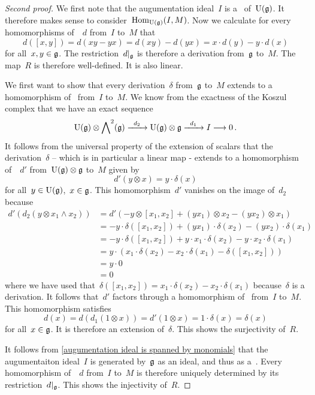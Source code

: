 \begin{proof}[Second proof]
  We first note that the augumentation ideal~$I$ is a~\submodule{$\Univ(\glie)$} of~$\Univ(\glie)$.
  It therefore makes sense to consider~$\operatorname{Hom}_{\operatorname{U}(\mathfrak{g})}(I, M)$.
  Now we calculate for every homomorphisms of~\modules{$\Univ(\glie)$}~$d$ from~$I$ to~$M$ that
  \[
    d([x,y])
    =
    d(xy - yx)
    =
    d(xy) - d(yx)
    =
    x \cdot d(y) - y \cdot d(x)
  \]
  for all~$x, y \in \mathfrak{g}$.
  The restriction~$\restrict{d}{\glie}$ is therefore a derivation from~$\mathfrak{g}$ to~$M$.
  The map~$R$ is therefore well-defined.
  It is also linear.

  We first want to show that every derivation~$\delta$ from~$\mathfrak{g}$ to~$M$ extends to a homomorphism of~\modules{$\Univ(\glie)$} from~$I$ to~$M$.
  We know from the exactness of the Koszul complex that we have an exact sequence
  \[
    \Univ(\glie) \otimes \Exterior^2(\glie)
    \xto{d_2}
    \Univ(\glie) \otimes \glie
    \xto{d_1}
    I
    \to
    0 \,.
  \]
  It follows from the universal property of the extension of scalars that the derivation~$\delta$ -- which is in particular a linear map - extends to a homomorphism of~\modules{$\Univ(\glie)$}~$d'$ from~$\operatorname{U}(\mathfrak{g}) \otimes \mathfrak{g}$ to~$M$ given by
  \[
    d'(y \otimes x)
    =
    y \cdot \delta(x)
  \]
  for all~$y \in \operatorname{U}(\mathfrak{g})$,~$x \in \mathfrak{g}$.
  This homomorphism~$d'$ vanishes on the image of~$d_2$ because
  \begin{align*}
    d'( d_2(y \otimes x_1 \wedge x_2) )
    &=
    d'
    (
      - y \otimes [x_1, x_2]
      + (y x_1) \otimes x_2
      - (y x_2) \otimes x_1
    )
    \\
    &=
    - y \cdot \delta([x_1, x_2])
    + (y x_1) \cdot \delta(x_2)
    - (y x_2) \cdot \delta(x_1)
    \\
    &=
    - y \cdot \delta([x_1, x_2])
    + y \cdot x_1 \cdot \delta(x_2)
    - y \cdot x_2 \cdot \delta(x_1)
    \\
    &=
    y \cdot
    (
      x_1 \cdot \delta(x_2)
      - x_2 \cdot \delta(x_1)
      - \delta([x_1, x_2])
    )
    \\
    &=
    y \cdot 0
    \\
    &=
    0
  \end{align*}
  where we have used that~$\delta([x_1, x_2]) = x_1 \cdot \delta(x_2) - x_2 \cdot \delta(x_1)$ because~$\delta$ is a derivation.
  It follows that~$d'$ factors through a homomorphism of~\modules{$\Univ(\glie)$} from~$I$ to~$M$.
  This homomorphism satisfies
  \[
    d(x)
    =
    d( d_1(1 \otimes x) )
    =
    d'( 1 \otimes x )
    =
    1 \cdot \delta(x)
    =
    \delta(x)
  \]
  for all~$x \in \mathfrak{g}$.
  It is therefore an extension of~$\delta$.
  This shows the surjectivity of~$R$.

  It follows from \cref{augumentation ideal is spanned by monomials} that the augumentaiton ideal~$I$ is generated by~$\mathfrak{g}$ as an ideal, and thus as a~\module{$\Univ(\glie)$}.
  Every homomorphism of~\modules{$\Univ(\glie)$}~$d$ from~$I$ to~$M$ is therefore uniquely determined by its restriction~$\restrict{d}{\glie}$.
  This shows the injectivity of~$R$.
\end{proof}


